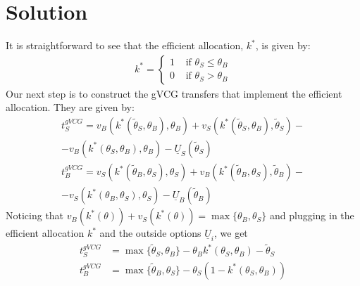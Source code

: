 \documentclass[a4paper]{article}
\newif\ifsolutions
\begin{document}
\ifsolutions
\section*{Solution}
It is straightforward to see that the efficient allocation, $k^*$, is given by:
\begin{align*}
	k^*= \begin{cases}
		1 & \text{ if } \theta_S \leq \theta_B \\ 
		0 & \text{ if } \theta_S > \theta_B
	\end{cases}
\end{align*}
Our next step is to construct the gVCG transfers that implement the efficient allocation. They are given by:
\begin{align*}
	t_S^{gVCG} = v_B(k^*(\tilde{\theta}_S,\theta_B),\theta_B) + v_S(k^*(\tilde{\theta}_S,\theta_B),\tilde{\theta}_S) - \\
	-v_B(k^*(\theta_S,\theta_B),\theta_B) - \underline{U}_S(\tilde{\theta}_S)
	\\
	t_B^{gVCG} = v_S(k^*(\tilde{\theta}_B,\theta_S),\theta_S) + v_B(k^*(\tilde{\theta}_B,\theta_S),\tilde{\theta}_B) - \\
	-v_S(k^*(\theta_B,\theta_S),\theta_S) - \underline{U}_B(\tilde{\theta}_B)
\end{align*}
Noticing that $v_B(k^*(\theta))+v_S(k^*(\theta)) = \max \{\theta_B,\theta_S\}$ and plugging in the efficient allocation $k^*$ and the outside options $\underline{U}_i$, we get
\begin{align*}
	t_S^{gVCG} &= \max\{\tilde{\theta}_S,\theta_B\} - \theta_B k^*(\theta_S,\theta_B) - \tilde{\theta}_S
	\\
	t_B^{gVCG} &= \max\{\tilde{\theta}_B,\theta_S\} - \theta_S \left(1 - k^*(\theta_S,\theta_B)\right)
\end{align*}
\end{document}
